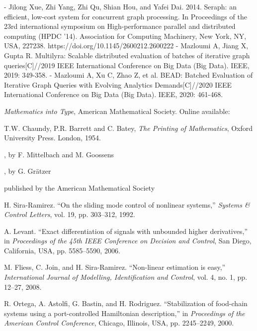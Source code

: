\documentclass[lettersize,journal]{IEEEtran} %
\begin{document}
- Jilong Xue, Zhi Yang, Zhi Qu, Shian Hou, and Yafei Dai. 2014. Seraph: an efficient, low-cost system for concurrent graph processing. In Proceedings of the 23rd international symposium on High-performance parallel and distributed computing (HPDC '14). Association for Computing Machinery, New York, NY, USA, 227238. https://doi.org/10.1145/2600212.2600222
- Mazloumi A, Jiang X, Gupta R. Multilyra: Scalable distributed evaluation of batches of iterative graph queries[C]//2019 IEEE International Conference on Big Data (Big Data). IEEE, 2019: 349-358.
- Mazloumi A, Xu C, Zhao Z, et al. BEAD: Batched Evaluation of Iterative Graph Queries with Evolving Analytics Demands[C]//2020 IEEE International Conference on Big Data (Big Data). IEEE, 2020: 461-468.

\begin{thebibliography}{1} %

{\it{Mathematics into Type}}, American Mathematical Society. Online available:  %

T.W. Chaundy, P.R. Barrett and C. Batey, {\it{The Printing of Mathematics}}, Oxford University Press. London, 1954.

, by F. Mittelbach and M. Goossens

, by G. Gr\"atzer

 published by the American Mathematical Society

H. Sira-Ramirez. ``On the sliding mode control of nonlinear systems,'' \textit{Systems \& Control Letters}, vol. 19, pp. 303--312, 1992.

A. Levant. ``Exact differentiation of signals with unbounded higher derivatives,''  in \textit{Proceedings of the 45th IEEE Conference on Decision and Control}, San Diego, California, USA, pp. 5585--5590, 2006.

M. Fliess, C. Join, and H. Sira-Ramirez. ``Non-linear estimation is easy,'' \textit{International Journal of Modelling, Identification and Control}, vol. 4, no. 1, pp. 12--27, 2008.

R. Ortega, A. Astolfi, G. Bastin, and H. Rodriguez. ``Stabilization of food-chain systems using a port-controlled Hamiltonian description,'' in \textit{Proceedings of the American Control Conference}, Chicago, Illinois, USA, pp. 2245--2249, 2000. %

\end{thebibliography} %
\end{document}

